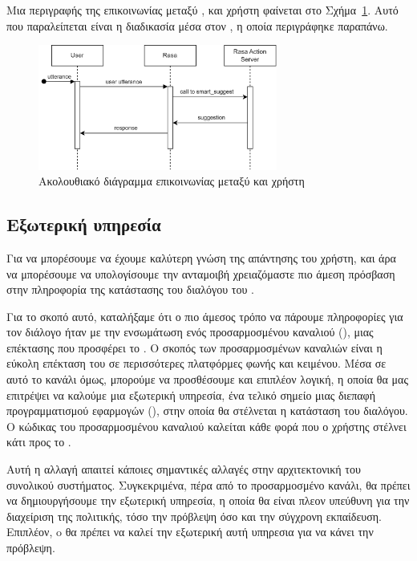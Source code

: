 Μια περιγραφής της επικοινωνίας μεταξύ ,  και χρήστη φαίνεται στο Σχήμα~\ref{fig:rasa_sequence}. Αυτό που παραλείπεται είναι η διαδικασία μέσα στον , η οποία περιγράφηκε παραπάνω.

\begin{figure}
    \centering
    \includegraphics[width=0.7\textwidth]{body_matter/our_work/images/Rasa_ActionServer.png}
    \caption{Ακολουθιακό διάγραμμα επικοινωνίας μεταξύ  και χρήστη}
    \label{fig:rasa_sequence}
\end{figure}

\subsection{Εξωτερική υπηρεσία}

Για να μπορέσουμε να έχουμε καλύτερη γνώση της απάντησης του χρήστη, και άρα να μπορέσουμε να υπολογίσουμε την ανταμοιβή χρειαζόμαστε πιο άμεση πρόσβαση στην πληροφορία της κατάστασης του διαλόγου του .

Για το σκοπό αυτό, καταλήξαμε ότι ο πιο άμεσος τρόπο να πάρουμε πληροφορίες για τον διάλογο ήταν με την ενσωμάτωση ενός προσαρμοσμένου καναλιού (), μιας επέκτασης που προσφέρει το . Ο σκοπός των προσαρμοσμένων καναλιών είναι η εύκολη επέκταση του  σε περισσότερες πλατφόρμες φωνής και κειμένου. Μέσα σε αυτό το κανάλι όμως, μπορούμε να προσθέσουμε και επιπλέον λογική, η οποία θα μας επιτρέψει να καλούμε μια εξωτερική υπηρεσία, ένα τελικό σημείο μιας διεπαφή προγραμματισμού εφαρμογών  (), στην οποία θα στέλνεται η κατάσταση του διαλόγου. Ο κώδικας του προσαρμοσμένου καναλιού καλείται κάθε φορά που ο χρήστης στέλνει κάτι προς το .

Αυτή η αλλαγή απαιτεί κάποιες σημαντικές αλλαγές στην αρχιτεκτονική του συνολικού συστήματος. Συγκεκριμένα, πέρα από το προσαρμοσμένο κανάλι, θα πρέπει να δημιουργήσουμε την εξωτερική υπηρεσία, η οποία θα είναι πλεον υπεύθυνη για την διαχείριση της πολιτικής, τόσο την πρόβλεψη όσο και την σύγχρονη εκπαίδευση. Επιπλέον, o  θα πρέπει να καλεί την εξωτερική αυτή υπηρεσια για να κάνει την πρόβλεψη.

